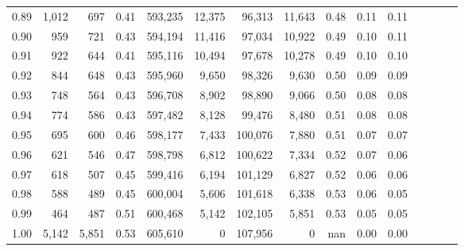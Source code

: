 \begin{tabular}{rrrcrrrrrrrrrrr}
0.89 &   1,012 &    697 &                                       0.41 &  593,235 &   12,375 &   96,313 &   11,643 &  0.48 &  0.11 &                         0.11 \\
0.90 &     959 &    721 &                                       0.43 &  594,194 &   11,416 &   97,034 &   10,922 &  0.49 &  0.10 &                         0.11 \\
0.91 &     922 &    644 &                                       0.41 &  595,116 &   10,494 &   97,678 &   10,278 &  0.49 &  0.10 &                         0.10 \\
0.92 &     844 &    648 &                                       0.43 &  595,960 &    9,650 &   98,326 &    9,630 &  0.50 &  0.09 &                         0.09 \\
0.93 &     748 &    564 &                                       0.43 &  596,708 &    8,902 &   98,890 &    9,066 &  0.50 &  0.08 &                         0.08 \\
0.94 &     774 &    586 &                                       0.43 &  597,482 &    8,128 &   99,476 &    8,480 &  0.51 &  0.08 &                         0.08 \\
0.95 &     695 &    600 &                                       0.46 &  598,177 &    7,433 &  100,076 &    7,880 &  0.51 &  0.07 &                         0.07 \\
0.96 &     621 &    546 &                                       0.47 &  598,798 &    6,812 &  100,622 &    7,334 &  0.52 &  0.07 &                         0.06 \\
0.97 &     618 &    507 &                                       0.45 &  599,416 &    6,194 &  101,129 &    6,827 &  0.52 &  0.06 &                         0.06 \\
0.98 &     588 &    489 &                                       0.45 &  600,004 &    5,606 &  101,618 &    6,338 &  0.53 &  0.06 &                         0.05 \\
0.99 &     464 &    487 &                                       0.51 &  600,468 &    5,142 &  102,105 &    5,851 &  0.53 &  0.05 &                         0.05 \\
1.00 &   5,142 &  5,851 &                                       0.53 &  605,610 &        0 &  107,956 &        0 &   nan &  0.00 &                         0.00 \\
\bottomrule
\end{tabular}

